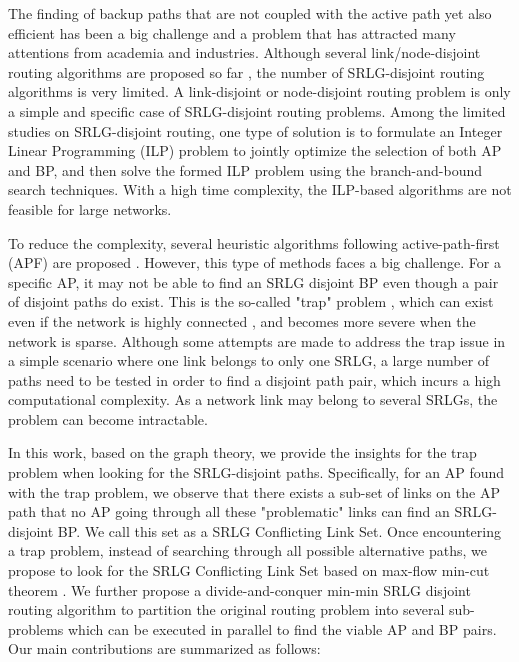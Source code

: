 The finding of backup paths that are not coupled with the active path yet also efficient has been a big challenge and a problem that has attracted many attentions from academia and industries. Although several link/node-disjoint routing algorithms are proposed so far \cite{suurballe1984quick,bhandari1997optimal,li1990complexity,guo2003link,xu2004finding,beshir2011variants,guo2013finding,hu2003diverse}, the number of SRLG-disjoint routing algorithms is very limited.  A link-disjoint or node-disjoint routing problem is only a simple and specific case of SRLG-disjoint routing problems. Among the limited studies on SRLG-disjoint routing, one type of solution is to formulate an Integer Linear Programming (ILP) \cite{hu2003diverse} problem to jointly optimize the selection of both AP and BP, and then solve the formed ILP problem using the branch-and-bound \cite{lawler1966branch} search techniques. With a high time complexity, the ILP-based algorithms are not feasible for large networks.

  To reduce the complexity, several heuristic algorithms following active-path-first (APF) are proposed \cite{oki2002disjoint,li2002fiber,eppstein1998finding}. However, this type of methods faces a big challenge. For a specific AP, it may not be able to find an SRLG disjoint BP even though a pair of disjoint paths do exist. This is the so-called "trap" problem \cite{dunn1994comparison}, which can exist even if the network is highly connected \cite{laborczi2001solving}, and becomes more severe when the network is sparse. Although some attempts are made to address the trap issue in a simple scenario where  one link belongs to only one SRLG,  a large number of paths need to be tested in order to find a disjoint path pair, which incurs a high computational complexity. As a network link may belong to several SRLGs, the problem can become intractable.

In this work, based on the graph theory, we provide the insights for the trap problem when looking for the SRLG-disjoint paths. Specifically, for an AP found with the trap problem, we observe that there exists a sub-set of links on the AP path that no AP going through all these "problematic" links can find an SRLG-disjoint BP. We call this set as a SRLG Conflicting Link Set. Once encountering a trap problem, instead of searching through all possible alternative paths, we propose to look for the SRLG Conflicting Link Set based on max-flow min-cut theorem \cite{ford2015flows}. We further propose a divide-and-conquer min-min SRLG disjoint routing algorithm to partition the original routing problem into several sub-problems which can be executed in parallel to find the viable AP and BP pairs. Our main contributions are summarized as follows:



